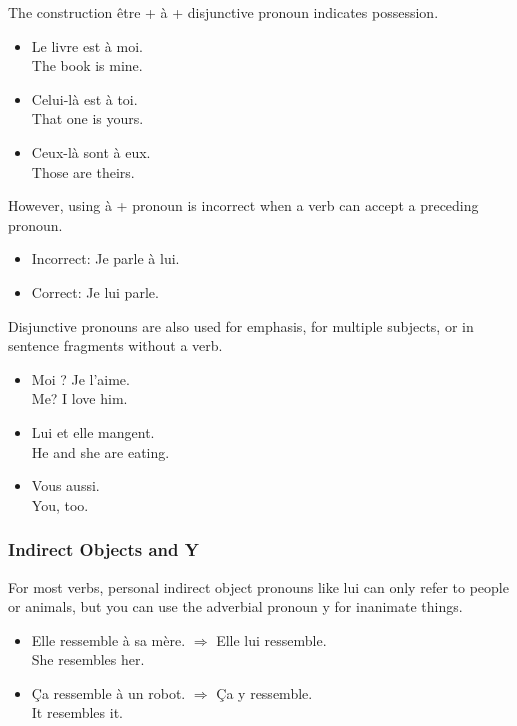 The construction {\^e}tre + {\`a} + disjunctive pronoun indicates possession.

\begin{itemize}
  \item  Le livre est {\`a} moi. \\ The book is mine.
	\item  Celui-l{\`a} est {\`a} toi. \\ That one is yours.
	\item  Ceux-l{\`a} sont {\`a} eux. \\ Those are theirs.
\end{itemize}

However, using {\`a} + pronoun is incorrect when a verb can accept a preceding pronoun.

\begin{itemize}
  \item  Incorrect: Je parle à lui.
	\item  Correct: Je lui parle.
\end{itemize}

Disjunctive pronouns are also used for emphasis, for multiple subjects, or in sentence fragments without a verb.

\begin{itemize}
  \item  Moi ? Je l'aime. \\ Me? I love him.
	\item  Lui et elle mangent. \\ He and she are eating.
	\item  Vous aussi. \\ You, too.
\end{itemize}

\subsubsection{Indirect Objects and Y}

For most verbs, personal indirect object pronouns like lui can only refer to people or animals, but you can use the adverbial pronoun y for inanimate things.

\begin{itemize}
  \item  Elle ressemble {\`a} sa m{\`e}re. $\Rightarrow$ Elle lui ressemble. \\ She resembles her.
	\item  {\c C}a ressemble {\`a} un robot. $\Rightarrow$ {\c C}a y ressemble. \\ It resembles it.
\end{itemize}

